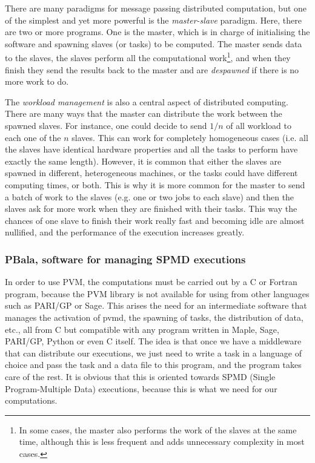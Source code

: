 There are many paradigms for message passing distributed computation, but one of the simplest and yet more powerful is the \emph{master-slave} paradigm. Here, there are two or more programs. One is the master, which is in charge of initialising the software and spawning slaves (or tasks) to be computed. The master sends data to the slaves, the slaves perform all the computational work\footnote{In some cases, the master also performs the work of the slaves at the same time, although this is less frequent and adds unnecessary complexity in most cases.}, and when they finish they send the results back to the master and are \emph{despawned} if there is no more work to do.

The \emph{workload management} is also a central aspect of distributed computing. There are many ways that the master can distribute the work between the spawned slaves. For instance, one could decide to send $1/n$ of all workload to each one of the $n$ slaves. This can work for completely homogeneous cases (i.e. all the slaves have identical hardware properties and all the tasks to perform have exactly the same length). However, it is common that either the slaves are spawned in different, heterogeneous machines, or the tasks could have different computing times, or both. This is why it is more common for the master to send a batch of work to the slaves (e.g. one or two jobs to each slave) and then the slaves ask for more work when they are finished with their tasks. This way the chances of one slave to finish their work really fast and becoming idle are almost nullified, and the performance of the execution increases greatly.



\subsubsection{PBala, software for managing SPMD executions}

In order to use PVM, the computations must be carried out by a C or Fortran program, because the PVM library is not available for using from other languages such as PARI/GP or Sage. This arises the need for an intermediate software that manages the activation of pvmd, the spawning of tasks, the distribution of data, etc., all from C but compatible with any program written in Maple, Sage, PARI/GP, Python or even C itself. The idea is that once we have a middleware that can distribute our executions, we just need to write a task in a language of choice and pass the task and a data file to this program, and the program takes care of the rest. It is obvious that this is oriented towards SPMD (Single Program-Multiple Data) executions, because this is what we need for our computations.

